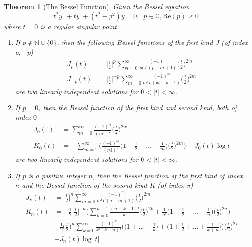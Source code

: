 \documentclass{article}
\newtheorem{theorem}{Theorem}[section]
\theoremstyle{remark}
\theoremstyle{definition}
\begin{document}
\begin{theorem}[The Bessel Function]
Given the Bessel equation 
\[t^2 y^{\prime\prime} + t y^\prime + (t^2 - p^2) y = 0, \;\; p \in \mathbb{C}, \text{Re}(p) \geq 0\]
where $t = 0$ is a regular singular point. 
\begin{enumerate}
    \item If $p \not\in \mathbb{N} \cup \{0\}$, then the following \textit{Bessel functions of the first kind} $J$ (of index $p, -p$) 
    \begin{align*}
        J_p (t) & = \bigg| \frac{t}{2}\bigg|^p \sum_{m=0}^\infty \frac{(-1)^m}{m! \Gamma(p+m+1)} \bigg(\frac{t}{2}\bigg)^{2m} \\
        J_{-p} (t) & = \bigg| \frac{t}{2}\bigg|^{-p} \sum_{m=0}^\infty \frac{(-1)^m}{m! \Gamma(m-p+1)} \bigg(\frac{t}{2}\bigg)^{2m}
    \end{align*}
    are two linearly independent solutions for $0 < |t| < \infty$. 
    \item If $p = 0$, then the Bessel function of the first kind and second kind, both of index $0$
    \begin{align*}
        J_0 (t) & = \sum_{m=0}^\infty \frac{(-1)^m}{(m!)^2} \bigg( \frac{t}{2}\bigg)^{2m} \\
        K_0 (t) & = - \sum_{m=1}^\infty \Bigg( \frac{(-1)^m}{(m!)^2} \bigg(1 + \frac{1}{2} + \ldots + \frac{1}{m} \bigg) \bigg(\frac{t}{2}\bigg)^{2m} \Bigg) + J_0 (t) \log{t}
    \end{align*}
    are two linearly independent solutions for $0 < |t|<\infty$. 
    \item If $p$ is a positive integer $n$, then the Bessel function of the first kind of index $n$ and the \textit{Bessel function of the second kind} $K$ (of index n)
    \begin{align*}
        J_n (t) & = \bigg| \frac{t}{2}\bigg|^n \sum_{m=0}^\infty \frac{(-1)^m}{m! \Gamma(n+m+1)} \bigg(\frac{t}{2}\bigg)^{2m} \\
        K_n (t) & = -\frac{1}{2} \bigg|\frac{t}{2}\bigg|^{-n} \bigg(\sum_{k=0}^{n-1} \frac{(n-k-1)!}{k!} \bigg(\frac{t}{2}\bigg)^{2k} + \frac{1}{n!}\bigg(1 + \frac{1}{2} + \ldots + \frac{1}{n}\bigg)\bigg(\frac{t}{2}\bigg)^{2n} \Bigg) \\
        & -\frac{1}{2} \bigg(\frac{t}{2} \bigg)^n \sum_{k=0}^\infty \frac{(-1)^k}{k!(k+n)!} \bigg(\Big(1 + \ldots + \frac{1}{k}\Big) + \Big(1 + \frac{1}{2} + \ldots + \frac{1}{k+n}\Big) \bigg) \bigg(\frac{t}{2}\bigg)^{2k} \\
        & + J_n (t) \log{|t|}
    \end{align*}
\end{enumerate}
\end{theorem}
\end{document}
